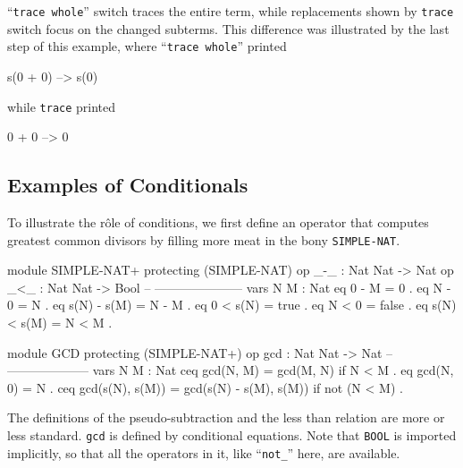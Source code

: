 \documentclass[a4paper]{memoir}
\begin{document}
``\verb|trace whole|'' switch traces the entire term, while
replacements shown by \verb|trace| switch focus on the
changed subterms. This difference was illustrated by the last
step of this example, where ``\verb|trace whole|'' printed
\begin{vvtm}
\begin{ccode}
  [2] s(0 + 0) --> s(0)
\end{ccode}
\end{vvtm}
while \verb|trace| printed
\begin{vvtm}
\begin{ccode}
  [2] 0 + 0 --> 0
\end{ccode}
\end{vvtm}

\subsection{Examples of Conditionals}\label{sec:p2-ex-cond}

To illustrate the r{\^ o}le of conditions, we first define an operator
that computes greatest common divisors by filling more meat in the bony
\verb|SIMPLE-NAT|.\label{exs:simple-nat+}\label{exs:gcd}
\begin{vvtm}
\begin{ccode}
  module SIMPLE-NAT+ {
    protecting (SIMPLE-NAT)
    op _-_ : Nat Nat -> Nat
    op _<_ : Nat Nat -> Bool
    -- ---------------------
    vars N M : Nat
    eq 0 - M = 0 .
    eq N - 0 = N .
    eq s(N) - s(M) = N - M .
    eq 0 < s(N) = true .
    eq N < 0 = false .
    eq s(N) < s(M) = N < M .
  }

  module GCD {
    protecting (SIMPLE-NAT+)
    op gcd : Nat Nat -> Nat
    -- --------------------
    vars N M : Nat
    ceq gcd(N, M) = gcd(M, N) if N < M .
    eq gcd(N, 0) = N .
    ceq gcd(s(N), s(M)) = gcd(s(N) - s(M), s(M))
        if not (N < M) .
  }
\end{ccode}
\end{vvtm}
The definitions of the pseudo-subtraction and the less than relation are
more or less standard. \verb|gcd| is defined by conditional equations.
Note that \verb|BOOL| is imported implicitly, so that all the operators
in it, like ``\verb|not_|'' here, are available.
\end{document}
